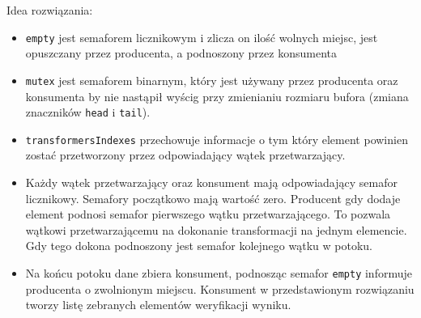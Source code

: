 \documentclass[11pt]{article}
\begin{document}
Idea rozwiązania:
\begin{itemize}
\item \texttt{empty} jest semaforem licznikowym i zlicza on ilość wolnych miejsc,
jest opuszczany przez producenta, a podnoszony przez konsumenta
\item \texttt{mutex} jest semaforem binarnym, który jest używany przez producenta
oraz konsumenta by nie nastąpił wyścig przy zmienianiu rozmiaru bufora
(zmiana znaczników \texttt{head} i \texttt{tail}).
\item \texttt{transformersIndexes} przechowuje informacje o tym który element
powinien zostać przetworzony przez odpowiadający wątek przetwarzający.
\item Każdy wątek przetwarzający oraz konsument mają odpowiadający semafor licznikowy.
Semafory początkowo mają wartość zero.
Producent gdy dodaje element podnosi semafor pierwszego wątku przetwarzającego.
To pozwala wątkowi przetwarzającemu na dokonanie transformacji na jednym elemencie.
Gdy tego dokona podnoszony jest semafor kolejnego wątku w potoku.
\item Na końcu potoku dane zbiera konsument, podnosząc semafor \texttt{empty} informuje producenta
o zwolnionym miejscu. Konsument w przedstawionym rozwiązaniu
tworzy listę zebranych elementów weryfikacji wyniku.
\end{itemize}
\end{document}
